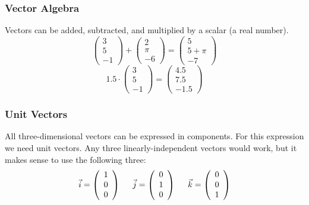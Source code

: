 \documentclass[xcolor=dvipsnames]{beamer}
\begin{document}
\begin{frame}
  \frametitle{Vector Algebra}
  Vectors can be added, subtracted, and multiplied by a scalar (a real
  number).
  \begin{equation}
    \label{eq:kaepuema}
    \left(
    \begin{array}{c}
      3 \\
      5 \\
      -1
    \end{array}\right)+
  \left(
    \begin{array}{c}
      2 \\
      \pi \\
      -6
    \end{array}\right)=
  \left(
    \begin{array}{c}
      5 \\
      5+\pi \\
      -7
    \end{array}\right)
  \end{equation}
  \begin{equation}
    \label{eq:kemodaim}
    1.5\cdot\left(
    \begin{array}{c}
      3 \\
      5 \\
      -1
    \end{array}\right)=
  \left(
    \begin{array}{c}
      4.5 \\
      7.5 \\
      -1.5
    \end{array}\right)
  \end{equation}
\end{frame}

\begin{frame}
  \frametitle{Unit Vectors}
  All three-dimensional vectors can be expressed in components. For
  this expression we need unit vectors. Any three linearly-independent
  vectors would work, but it makes sense to use the following three:
  \begin{equation}
    \label{eq:bahniech}
    \vec{i}=\left(
    \begin{array}{c}
      1 \\
      0 \\
      0
    \end{array}\right)\hspace{.2in}
    \vec{j}=\left(
    \begin{array}{c}
      0 \\
      1 \\
      0
    \end{array}\right)\hspace{.2in}
    \vec{k}=\left(
    \begin{array}{c}
      0 \\
      0 \\
      1
    \end{array}\right)
  \end{equation}
\end{frame}
\end{document}
